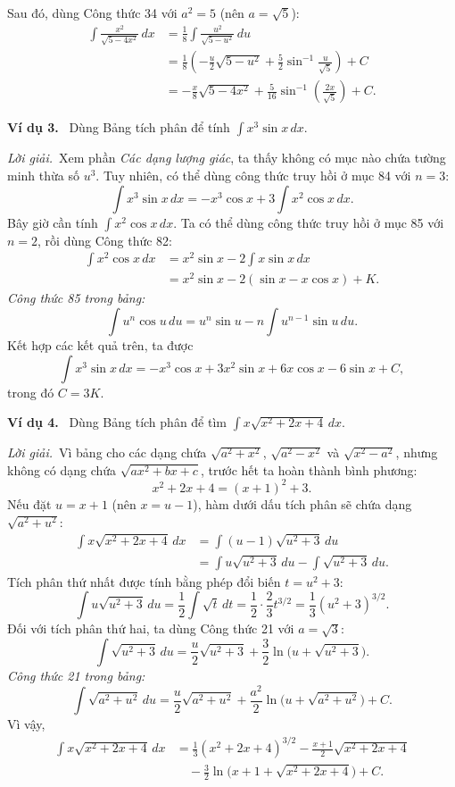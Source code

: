 \documentclass[12pt,a4paper]{article}
\newcommand{\ex}[1]{\par\medskip\noindent\textbf{Ví dụ #1.}\ }
\newcommand{\sol}{\par\nopagebreak[4]\noindent\textit{Lời giải.}\ }
\begin{document}
Sau đó, dùng Công thức 34 với $a^2=5$ (nên $a=\sqrt5$):
\begin{align*}
\int\frac{x^2}{\sqrt{5-4x^2}}\,dx
&=\frac18\int\frac{u^2}{\sqrt{5-u^2}}\,du\\
&=\frac18\left(-\frac u2\sqrt{5-u^2}+\frac52\sin^{-1}\frac{u}{\sqrt5}\right)+C\\
&=-\frac x8\sqrt{5-4x^2}+\frac5{16}\sin^{-1}\left(\frac{2x}{\sqrt5}\right)+C.
\end{align*}

\ex{3} Dùng Bảng tích phân để tính $\displaystyle\int x^3\sin x\,dx$.
\sol Xem phần \textit{Các dạng lượng giác}, ta thấy không có mục nào chứa tường minh thừa số $u^3$. Tuy nhiên, có thể dùng công thức truy hồi ở mục 84 với $n=3$:
\[\int x^3\sin x\,dx=-x^3\cos x+3\int x^2\cos x\,dx.\]
Bây giờ cần tính $\int x^2\cos x\,dx$. Ta có thể dùng công thức truy hồi ở mục 85 với $n=2$, rồi dùng Công thức 82:
\begin{align*}
\int x^2\cos x\,dx&=x^2\sin x-2\int x\sin x\,dx\\
&=x^2\sin x-2(\sin x-x\cos x)+K.
\end{align*}
\textit{Công thức 85 trong bảng:}
\[\int u^n\cos u\,du=u^n\sin u-n\int u^{n-1}\sin u\,du.\]
Kết hợp các kết quả trên, ta được
\[\int x^3\sin x\,dx=-x^3\cos x+3x^2\sin x+6x\cos x-6\sin x+C,\]
trong đó $C=3K$.

\ex{4} Dùng Bảng tích phân để tìm $\displaystyle\int x\sqrt{x^2+2x+4}\,dx$.
\sol Vì bảng cho các dạng chứa $\sqrt{a^2+x^2}$, $\sqrt{a^2-x^2}$ và $\sqrt{x^2-a^2}$, nhưng không có dạng chứa $\sqrt{ax^2+bx+c}$, trước hết ta hoàn thành bình phương:
\[x^2+2x+4=(x+1)^2+3.\]
Nếu đặt $u=x+1$ (nên $x=u-1$), hàm dưới dấu tích phân sẽ chứa dạng $\sqrt{a^2+u^2}$:
\begin{align*}
\int x\sqrt{x^2+2x+4}\,dx
&=\int(u-1)\sqrt{u^2+3}\,du\\
&=\int u\sqrt{u^2+3}\,du-\int\sqrt{u^2+3}\,du.
\end{align*}
Tích phân thứ nhất được tính bằng phép đổi biến $t=u^2+3$:
\[\int u\sqrt{u^2+3}\,du
=\frac12\int\sqrt t\,dt
=\frac12\cdot\frac23t^{3/2}
=\frac13(u^2+3)^{3/2}.\]
Đối với tích phân thứ hai, ta dùng Công thức 21 với $a=\sqrt3$:
\[\int\sqrt{u^2+3}\,du
=\frac u2\sqrt{u^2+3}+\frac32\ln\bigl(u+\sqrt{u^2+3}\bigr).\]
\textit{Công thức 21 trong bảng:}
\[\int\sqrt{a^2+u^2}\,du
=\frac u2\sqrt{a^2+u^2}+\frac{a^2}{2}\ln\bigl(u+\sqrt{a^2+u^2}\bigr)+C.\]
Vì vậy,
\begin{align*}
\int x\sqrt{x^2+2x+4}\,dx
&=\frac13(x^2+2x+4)^{3/2}-\frac{x+1}{2}\sqrt{x^2+2x+4}\\
&\quad-\frac32\ln\bigl(x+1+\sqrt{x^2+2x+4}\bigr)+C.
\end{align*}
\end{document}
